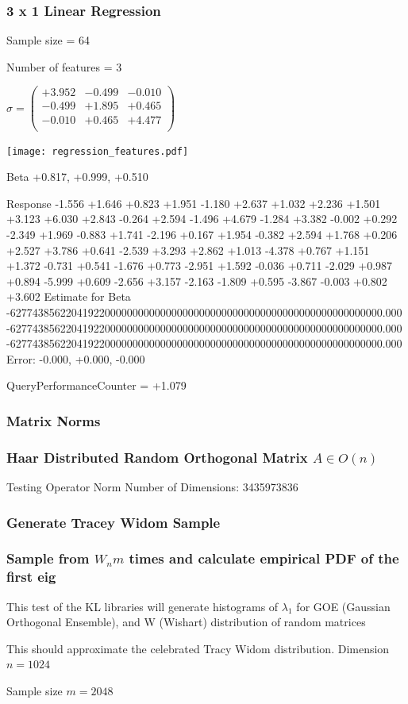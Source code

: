 \documentclass[12pt]{article}
\theoremstyle{definition}
\theoremstyle{remark}
\numberwithin{equation}{section}
\begin{document}
\subsubsection{3 x 1 Linear Regression}
Sample size = 64

Number of features = 3

$\sigma = \left(
\begin{array}{
ccc}
+3.952 & -0.499 & -0.010 \\
-0.499 & +1.895 & +0.465 \\
-0.010 & +0.465 & +4.477 \\
\end{array}
\right)$

\texttt{[image: regression\_features.pdf]}

Beta
+0.817, +0.999, +0.510

Response
-1.556
+1.646
+0.823
+1.951
-1.180
+2.637
+1.032
+2.236
+1.501
+3.123
+6.030
+2.843
-0.264
+2.594
-1.496
+4.679
-1.284
+3.382
-0.002
+0.292
-2.349
+1.969
-0.883
+1.741
-2.196
+0.167
+1.954
-0.382
+2.594
+1.768
+0.206
+2.527
+3.786
+0.641
-2.539
+3.293
+2.862
+1.013
-4.378
+0.767
+1.151
+1.372
-0.731
+0.541
-1.676
+0.773
-2.951
+1.592
-0.036
+0.711
-2.029
+0.987
+0.894
-5.999
+0.609
-2.656
+3.157
-2.163
-1.809
+0.595
-3.867
-0.003
+0.802
+3.602
Estimate for Beta
-6277438562204192200000000000000000000000000000000000000000000000000.000
-6277438562204192200000000000000000000000000000000000000000000000000.000
-6277438562204192200000000000000000000000000000000000000000000000000.000
Error:
-0.000, +0.000, -0.000


QueryPerformanceCounter  =  +1.079
\subsubsection{Matrix Norms}
\subsubsection{Haar Distributed Random Orthogonal Matrix $A \in O(n)$}
 Testing Operator Norm
Number of Dimensions: 3435973836

\subsubsection{Generate Tracey Widom Sample}
\subsubsection{Sample from $W_n m$ times and calculate empirical PDF of the first eig}
This test of the KL libraries will generate histograms of 		  $\lambda_1$ for GOE (Gaussian Orthogonal Ensemble), and W (Wishart) 		  distribution of random matrices

This should approximate the celebrated Tracy Widom distribution.
Dimension $n = 1024$

Sample size $m = 2048$
\end{document}
